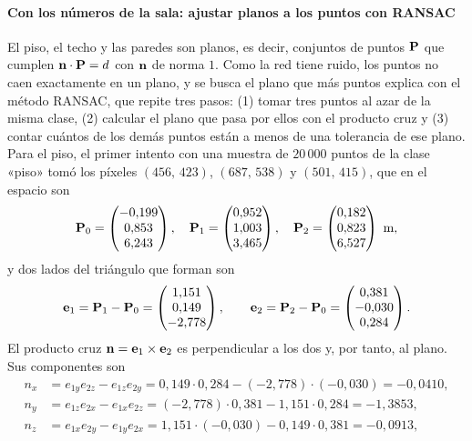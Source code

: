 \paragraph{Con los números de la sala: ajustar planos a los puntos con RANSAC} El piso, el techo y las paredes son planos, es decir, conjuntos de puntos $\mathbf{P}$ que cumplen
$\mathbf{n}\cdot\mathbf{P}=d$ con $\mathbf{n}$ de norma $1$. Como la red tiene ruido, los puntos no caen exactamente en un plano, y se busca el
plano que más puntos explica con el método RANSAC, que repite tres pasos:
(1) tomar tres puntos al azar de la misma clase, (2) calcular el plano que pasa por ellos con el producto cruz y (3) contar cuántos de los demás puntos
están a menos de una tolerancia de ese plano. Para el piso, el primer intento con una muestra de $20\,000$ puntos de la clase «piso» tomó los
píxeles $(456,\,423)$, $(687,\,538)$ y $(501,\,415)$, que en el espacio son
\begin{equation}
\mathbf{P}_0=\begin{pmatrix} -0{,}199 \\ 0{,}853 \\ 6{,}243 \end{pmatrix},\quad \mathbf{P}_1=\begin{pmatrix} 0{,}952 \\ 1{,}003 \\ 3{,}465 \end{pmatrix},\quad \mathbf{P}_2=\begin{pmatrix} 0{,}182 \\ 0{,}823 \\ 6{,}527 \end{pmatrix}\ \text{m},
\end{equation}
y dos lados del triángulo que forman son
\begin{equation}
\mathbf{e}_1=\mathbf{P}_1-\mathbf{P}_0=\begin{pmatrix} 1{,}151 \\ 0{,}149 \\ -2{,}778 \end{pmatrix},\qquad \mathbf{e}_2=\mathbf{P}_2-\mathbf{P}_0=\begin{pmatrix} 0{,}381 \\ -0{,}030 \\ 0{,}284 \end{pmatrix} .
\end{equation}
El producto cruz $\mathbf{n}=\mathbf{e}_1\times\mathbf{e}_2$ es perpendicular a los dos y, por tanto, al plano. Sus componentes son
\begin{align*}
n_x&=e_{1y}e_{2z}-e_{1z}e_{2y}=0{,}149\cdot0{,}284-\left(-2{,}778\right)\cdot\left(-0{,}030\right)=-0{,}0410,\\
n_y&=e_{1z}e_{2x}-e_{1x}e_{2z}=\left(-2{,}778\right)\cdot0{,}381-1{,}151\cdot0{,}284=-1{,}3853,\\
n_z&=e_{1x}e_{2y}-e_{1y}e_{2x}=1{,}151\cdot\left(-0{,}030\right)-0{,}149\cdot0{,}381=-0{,}0913,
\end{align*}
